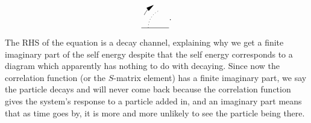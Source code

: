 \documentclass[hyperref, a4paper]{article}
\newenvironment{qanda}{\setlength{\parindent}{0pt}}{\bigskip}
\begin{document}
\begin{qanda}
\[\begin{gathered}
\begin{tikzpicture}[x=0.75pt,y=0.75pt,yscale=-1,xscale=1]
            \draw    (89,112) -- (132.71,112) ;
            \draw  [draw opacity=0][dash pattern={on 0.84pt off 2.51pt}] (100,112) .. controls (100,111.84) and (100,111.67) .. (100,111.51) .. controls (99.99,99.34) and (107.22,88.86) .. (117.63,84.15) -- (130,111.49) -- cycle ; \draw  [dash pattern={on 0.84pt off 2.51pt}] (100,112) .. controls (100,111.84) and (100,111.67) .. (100,111.51) .. controls (99.99,99.34) and (107.22,88.86) .. (117.63,84.15) ;
            \draw  [draw opacity=0] (93.51,91.45) .. controls (96.04,85.66) and (100.24,81.01) .. (105.35,77.89) -- (121,103.49) -- cycle ; \draw   (93.51,91.45) .. controls (96.04,85.66) and (100.24,81.01) .. (105.35,77.89) ;
            \draw    (101.71,80.53) -- (107.08,76.7) ;
            \draw [shift={(108.71,75.53)}, rotate = 504.46] [fill={rgb, 255:red, 0; green, 0; blue, 0 }  ][line width=0.08]  [draw opacity=0] (12,-3) -- (0,0) -- (12,3) -- cycle    ;
            \end{tikzpicture}            
    \end{gathered}.
\]
The RHS of the equation is a decay channel, explaining why we get a finite imaginary part of the self energy despite that the self energy corresponds to a diagram which apparently has nothing to do with decaying.
Since now the correlation function (or the $S$-matrix element) has a finite imaginary part, 
we say the particle decays and will never come back because the correlation function gives the system's response to a particle added in, and an imaginary part means that as time goes by, it is more and more unlikely to see the particle being there.


\end{qanda}
\end{document}
